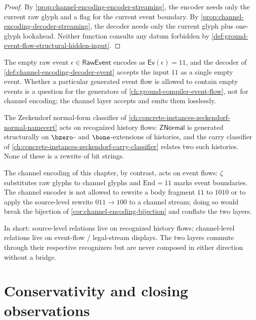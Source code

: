 \begin{proof}
By \autoref{prop:channel-encoding-encoder-streaming}, the encoder needs only the current raw glyph and a flag for the current event boundary. By \autoref{prop:channel-encoding-decoder-streaming}, the decoder needs only the current glyph plus one-glyph lookahead. Neither function consults any datum forbidden by \autoref{def:ground-event-flow-structural-hidden-input}.
\end{proof}

\begin{remark}
\label{rem:channel-encoding-empty-events}
The empty raw event $\epsilon \in \mathsf{RawEvent}$ encodes as $\mathsf{Ev}(\epsilon) = 11$, and the decoder of \autoref{def:channel-encoding-decoder-event} accepts the input $11$ as a single empty event. Whether a particular generated event flow is allowed to contain empty events is a question for the generators of \autoref{ch:ground-compiler-event-flow}, not for channel encoding; the channel layer accepts and emits them losslessly.
\end{remark}

\begin{remark}
\label{rem:channel-encoding-layer-separation}
The Zeckendorf normal-form classifier of \autoref{ch:concrete-instances-zeckendorf-normal-namecert} acts on recognized history flows: $\mathsf{ZNormal}$ is generated structurally on $\bzero$- and $\bone$-extensions of histories, and the carry classifier of \autoref{ch:concrete-instances-zeckendorf-carry-classifier} relates two such histories. None of these is a rewrite of bit strings.

The channel encoding of this chapter, by contrast, acts on event flows: $\zeta$ substitutes raw glyphs to channel glyphs and $\mathrm{End} = 11$ marks event boundaries. The channel encoder is not allowed to rewrite a body fragment $11$ to $1010$ or to apply the source-level rewrite $011 \to 100$ to a channel stream; doing so would break the bijection of \autoref{cor:channel-encoding-bijection} and conflate the two layers.

In short: source-level relations live on recognized history flows; channel-level relations live on event-flow / legal-stream displays. The two layers commute through their respective recognizers but are never composed in either direction without a bridge.
\end{remark}

\section{Conservativity and closing observations}
\label{sec:channel-encoding-conservativity}

